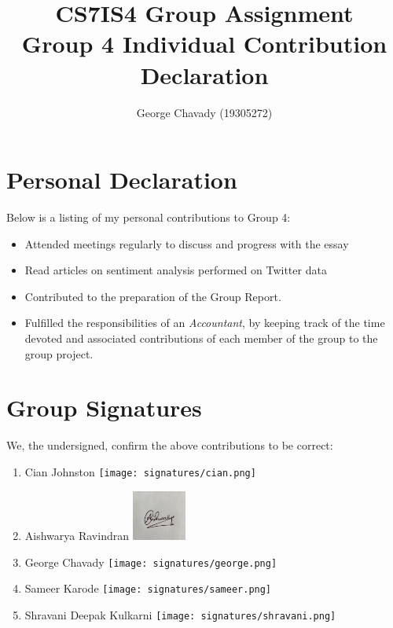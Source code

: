 \documentclass[a4paper,10pt]{article}
\begin{document}
\title{
    CS7IS4 Group Assignment \\
    \large Group 4 Individual Contribution Declaration
}
\author{
    George Chavady (19305272)
}

\maketitle

\section{Personal Declaration}

Below is a listing of my personal contributions to Group 4:

\begin{itemize}
    \item {Attended meetings regularly to discuss and progress with the essay}
    \item {Read articles on sentiment analysis performed on Twitter data }
    \item{
       Contributed to the preparation of the Group Report.
    }
    \item{
        Fulfilled the responsibilities of an \textit{Accountant}, by keeping track of the time devoted and associated contributions of each member of the group to the group project.
    }
\end{itemize}

\section{Group Signatures}

We, the undersigned, confirm the above contributions to be correct:

\begin{enumerate}
    \item{
        Cian Johnston \texttt{[image: signatures/cian.png]}
    }
    \item{
        Aishwarya Ravindran \includegraphics[width=0.7in]{signatures/Aishwarya.jpeg}
    }
    \item{
        George Chavady \texttt{[image: signatures/george.png]}
    }
    \item{
        Sameer Karode \texttt{[image: signatures/sameer.png]}
    }
    \item{
        Shravani Deepak Kulkarni \texttt{[image: signatures/shravani.png]}
    }

\end{enumerate}
\end{document}
